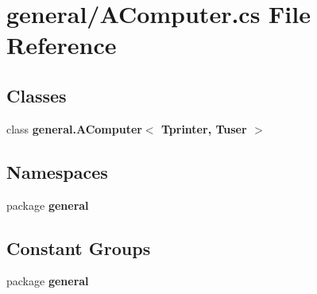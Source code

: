\section{general/\-A\-Computer.cs File Reference}
\label{_a_computer_8cs}
\subsection*{Classes}
\begin{DoxyCompactItemize}
\item 
class {\bf general.\-A\-Computer$<$ Tprinter, Tuser $>$}
\end{DoxyCompactItemize}
\subsection*{Namespaces}
\begin{DoxyCompactItemize}
\item 
package {\bf general}
\end{DoxyCompactItemize}
\subsection*{Constant Groups}
\begin{DoxyCompactItemize}
\item 
package {\bf general}
\end{DoxyCompactItemize}
